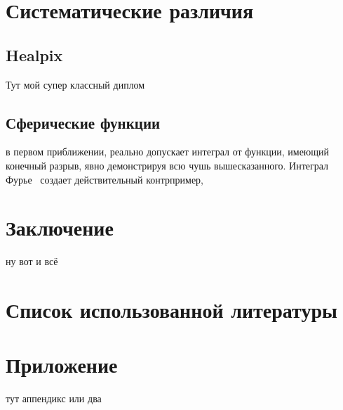 \documentclass[14pt,a4paper,russian]{article}
\begin{document}
\section{Систематические различия}\label{sistem}
		
\subsection{Healpix}\label{sub:smthhealpix}
Тут мой супер классный диплом

\subsection{Сферические функции}\label{sub:smthsf}
в первом приближении, реально допускает интеграл от функции, имеющий конечный разрыв,
явно демонстрируя всю чушь вышесказанного. Интеграл Фурье~\cite{book:sf} создает действительный контрпример,

\section{Заключение}\label{conclusion}
		ну вот и всё \cite{book:fourier} 

\newpage
\section{Список использованной литературы}\label{conclusionlit}
%
%
\printbibliography[type=online,title={Online only}]
\printbibliography[type=book,title={Статьи:}]


\appendix

\section*{Приложение}
тут аппендикс или два 
\end{document}

